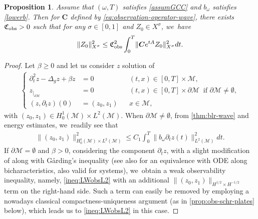 \documentclass[10pt]{amsart}
\newtheorem{proposition}[theorem]{Proposition}
\theoremstyle{definition}
\let\mc\mathcal
\newcommand{\M}{\mc{M}}
\newcommand{\bC}{\boldsymbol{C}}
\providecommand{\norm}[1]{\lVert#1\rVert}
\begin{document}
\begin{proposition}\label{prop:higher-reg-obs}
Assume that $(\omega, T)$ satisfies \ref{assumGCC} and $b_{\omega}$ satisfies \eqref{lowerb}. Then for $\bC$ defined by \eqref{eq:observation-operator-wave}, there exists $\mathfrak{C}_{\textup{obs}}>0$ such that for any $\sigma\in [0,1]$ and $Z_0\in X^\sigma$, we~have
\begin{align}\label{thm:ineq:LWobshigh}
\norm{Z_0}_{X^\sigma}^2\leq \mathfrak{C}_{\textup{obs}}^2\int_0^T \norm{\bC e^{tA}Z_0}_{X^\sigma}^2 dt.
\end{align}
\end{proposition}
\begin{proof}
Let $\beta\geq 0$ and let us consider $z$ solution of
\begin{align}\label{eq:LWbeta}
\left\{\begin{aligned}
\partial_t^2 z-\Delta_g z+\beta z&=0 &&(t, x)\in [0, T]\times\M,\\
z_{|_{\partial\M}}&=0 &&(t, x)\in [0, T]\times\partial\M\ \text{ if } \partial\M\neq\emptyset,\\
(z, \partial_t z)(0)&=(z_0, z_1) &&x\in \M,
\end{aligned}\right.
\end{align}
with $(z_0, z_1)\in H_0^1(\M)\times L^2(\M)$. When $\partial\M\neq\emptyset$, from \cref{thm:blr-wave} and energy estimates, we~readily see that
\begin{align}\label{ineq:LWobsL2}
\norm{(z_0, z_1)}_{H_0^1(\M)\times L^2(\M)}^2\leq C_1\int_0^T \norm{b_\omega\partial_t z(t)}_{L^2(\M)}^2 dt.
\end{align}
If $\partial\M=\emptyset$ and $\beta>0$, considering the component $\partial_t z$, with a slight modification of \cite[Prop.\,2.2]{LL16} along with G{\aa}rding's inequality \cite[Th.\,A.9]{LL16} (see also \cite[Th.\,1.3]{CLW:20} for an equivalence with ODE along bicharacteristics, also valid for systems), we~obtain a weak observability inequality, namely, \eqref{ineq:LWobsL2} with an additional $\norm{(z_0, z_1)}_{H^{1/2}\times H^{-1/2}}$ term on the right-hand side. Such a term can easily be removed by employing a nowadays classical compactness-uniqueness argument (as in \cref{prop:obs-schr-plates} below), which leads us to \eqref{ineq:LWobsL2} in this case.


\end{proof}
\end{document}
